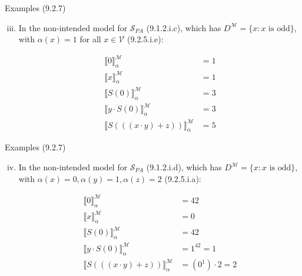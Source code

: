 \begin{frame}{Examples (9.2.7)}

\begin{enumerate}[(i)]
\setcounter{enumi}{2}
			
			\item In the non-intended model for $\mathcal{S}_{PA}$ (9.1.2.i.c), which has $D^\mathcal{M}=\{x:x\text{ is odd}\}$, with $\alpha(x)=1$ for all $x\in\mathcal{V}$ (9.2.5.i.e):
			
			\begin{align*}
			\llbracket 0\rrbracket^\mathcal{M}_\alpha&=1\\
			\llbracket x\rrbracket^\mathcal{M}_\alpha&=1\\
			\llbracket S(0)\rrbracket^\mathcal{M}_\alpha&=3\\
			\llbracket y\cdot S(0)\rrbracket^\mathcal{M}_\alpha&=3\\
			\llbracket S(((x\cdot y)+z))\rrbracket^\mathcal{M}_\alpha&=5
			\end{align*}
			
	\end{enumerate}
\end{frame}
\begin{frame}{Examples (9.2.7)}

\begin{enumerate}[(i)]
\setcounter{enumi}{3}
			
			\item In the non-intended model for $\mathcal{S}_{PA}$ (9.1.2.i.d), which has $D^\mathcal{M}=\{x:x\text{ is odd}\}$, with $\alpha(x)=0,\alpha(y)=1,\alpha(z)=2$ (9.2.5.i.a):
			
			\begin{align*}
			\llbracket 0\rrbracket^\mathcal{M}_\alpha&=42\\
			\llbracket x\rrbracket^\mathcal{M}_\alpha&=0\\
			\llbracket S(0)\rrbracket^\mathcal{M}_\alpha&=42\\
			\llbracket y\cdot S(0)\rrbracket^\mathcal{M}_\alpha&=1^{42}=1\\
			\llbracket S(((x\cdot y)+z))\rrbracket^\mathcal{M}_\alpha&=(0^1)\cdot 2=2
			\end{align*}

\end{enumerate}


\end{frame}

